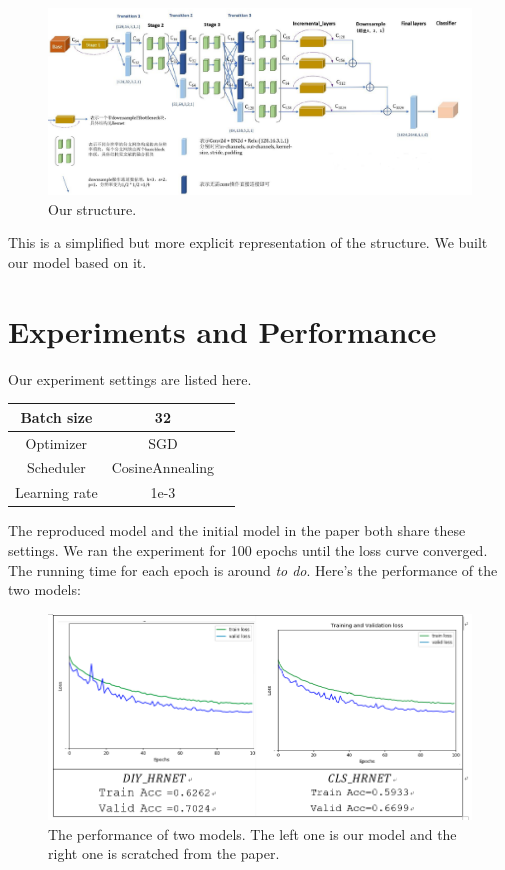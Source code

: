 \documentclass[10pt,twocolumn,letterpaper]{article}
\begin{document}
\begin{figure}[h]
   \begin{center}
      \includegraphics[width=0.8\linewidth]{3.png}
   \end{center}
      \caption{Our structure.}
   \label{fig:long}
   \label{fig:onecol}
\end{figure}

This is a simplified but more explicit representation of the structure.
We built our model based on it.

\section{Experiments and Performance}

Our experiment settings are listed here.

\begin{table}[h]
   \begin{center}
   \begin{tabular}{|c|c| p{5cm}|}  
   \hline  
   Batch size & 32 \\
   \hline  
   Optimizer & SGD \\
   \hline  
   Scheduler & CosineAnnealing \\  
   \hline
   Learning rate & 1e-3 \\
   \hline
   \end{tabular}  
   \end{center}  
\end{table}

The reproduced model and the initial model in the paper both share these settings.
We ran the experiment for 100 epochs until the loss curve converged.
The running time for each epoch is around \emph{to do}.
Here's the performance of the two models:

\begin{figure}[h]
   \begin{center}
      \includegraphics[width=0.8\linewidth]{1.png}
   \end{center}
      \caption{The performance of two models. The left one is our model 
      and the right one is scratched from the paper.}
   \label{fig:long}
   \label{fig:onecol}
\end{figure}
\end{document}
